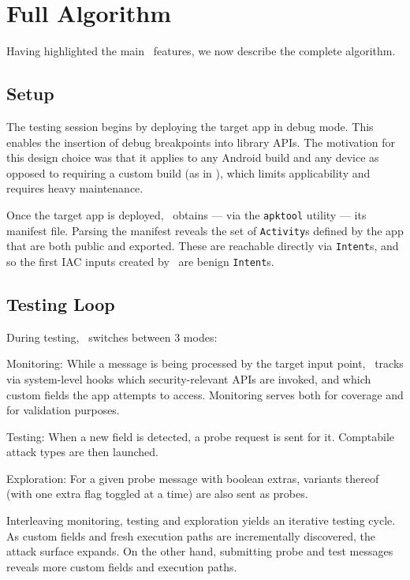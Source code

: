 \section{Full Algorithm}\label{Se:fullalg}

Having highlighted the main \Tool\ features, we now describe the complete algorithm.

\subsection{Setup}

The testing session begins by deploying the target app in debug mode. This enables the insertion of debug breakpoints into library APIs. The motivation for this design choice was that it applies to any Android build and any device as opposed to requiring a custom build (as in \cite{EGCCJMS:OSDI10}), which limits applicability and requires heavy maintenance.

Once the target app is deployed, \Tool\ obtains --- via the {\tt apktool} utility --- its manifest file. Parsing the manifest reveals the set of {\tt Activity}s defined by the app that are both public and exported. These are reachable directly via {\tt Intent}s, and so the first IAC inputs created by \Tool\ are benign {\tt Intent}s.

\subsection{Testing Loop}

During testing, \Tool\ switches between 3 modes:
\begin{compactitem}
	\item Monitoring: While a message is being processed by the target input point, \Tool\ tracks via system-level hooks which security-relevant APIs are invoked, and which custom fields the app attempts to access. Monitoring serves both for coverage and for validation purposes.
	\item Testing: When a new field is detected, a probe request is sent for it. Comptabile attack types are then launched. 
	\item Exploration: For a given probe message with boolean extras, variants thereof (with one extra flag toggled at a time) are also sent as probes.
\end{compactitem}
Interleaving monitoring, testing and exploration yields an iterative testing cycle. As custom fields and fresh execution paths are incrementally discovered, the attack surface expands. On the other hand, submitting probe and test messages reveals more custom fields and execution paths. 

